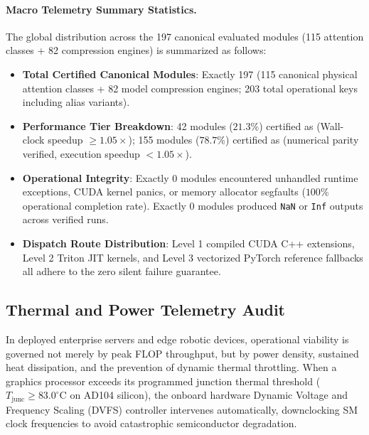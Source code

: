 \paragraph{Macro Telemetry Summary Statistics.}
The global distribution across the 197 canonical evaluated modules (115 attention classes + 82 compression engines) is summarized as follows:
\begin{itemize}
    \item \textbf{Total Certified Canonical Modules}: Exactly 197 (115 canonical physical attention classes + 82 model compression engines; 203 total operational keys including alias variants).
    \item \textbf{Performance Tier Breakdown}: 42 modules ($21.3\%$) certified as \passfast{} (Wall-clock speedup $\ge 1.05\times$); 155 modules ($78.7\%$) certified as \passslow{} (numerical parity verified, execution speedup $< 1.05\times$).
    \item \textbf{Operational Integrity}: Exactly 0 modules encountered unhandled runtime exceptions, CUDA kernel panics, or memory allocator segfaults ($100\%$ operational completion rate). Exactly 0 modules produced \texttt{NaN} or \texttt{Inf} outputs across verified runs.
    \item \textbf{Dispatch Route Distribution}: Level 1 compiled CUDA C++ extensions, Level 2 Triton JIT kernels, and Level 3 vectorized PyTorch reference fallbacks all adhere to the zero silent failure guarantee.
\end{itemize}

\subsection{Thermal and Power Telemetry Audit}
\label{subsec:app_e_thermal_power_census}

In deployed enterprise servers and edge robotic devices, operational viability is governed not merely by peak FLOP throughput, but by power density, sustained heat dissipation, and the prevention of dynamic thermal throttling. When a graphics processor exceeds its programmed junction thermal threshold ($T_{\text{junc}} \ge 83.0^\circ\text{C}$ on AD104 silicon), the onboard hardware Dynamic Voltage and Frequency Scaling (DVFS) controller intervenes automatically, downclocking SM clock frequencies to avoid catastrophic semiconductor degradation.

